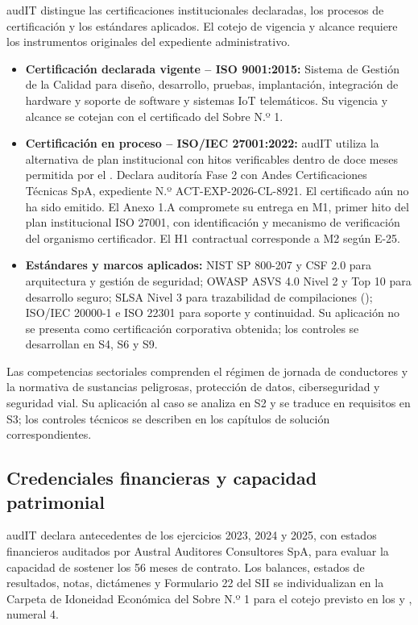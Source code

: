 audIT distingue las certificaciones institucionales declaradas, los procesos de certificación y los estándares aplicados. El cotejo de vigencia y alcance requiere los instrumentos originales del expediente administrativo.

\begin{itemize}
  \item \textbf{Certificación declarada vigente -- ISO 9001:2015:} Sistema de Gestión de la Calidad para diseño, desarrollo, pruebas, implantación, integración de hardware y soporte de software y sistemas IoT telemáticos. Su vigencia y alcance se cotejan con el certificado del Sobre N.º 1.
  \item \textbf{Certificación en proceso -- ISO/IEC 27001:2022:} audIT utiliza la alternativa de plan institucional con hitos verificables dentro de doce meses permitida por el . Declara auditoría Fase 2 con Andes Certificaciones Técnicas SpA, expediente N.º ACT-EXP-2026-CL-8921. El certificado aún no ha sido emitido. El Anexo 1.A compromete su entrega en M1, primer hito del plan institucional ISO 27001, con identificación y mecanismo de verificación del organismo certificador. El H1 contractual corresponde a M2 según E-25.
  \item \textbf{Estándares y marcos aplicados:} NIST SP 800-207 y CSF 2.0 para arquitectura y gestión de seguridad; OWASP ASVS 4.0 Nivel 2 y Top 10 para desarrollo seguro; SLSA Nivel 3 para trazabilidad de compilaciones (); ISO/IEC 20000-1 e ISO 22301 para soporte y continuidad. Su aplicación no se presenta como certificación corporativa obtenida; los controles se desarrollan en S4, S6 y S9.
\end{itemize}

Las competencias sectoriales comprenden el régimen de jornada de conductores y la normativa de sustancias peligrosas, protección de datos, ciberseguridad y seguridad vial. Su aplicación al caso se analiza en S2 y se traduce en requisitos en S3; los controles técnicos se describen en los capítulos de solución correspondientes.

\subsection{Credenciales financieras y capacidad patrimonial}\label{sec:1-financiero}

audIT declara antecedentes de los ejercicios 2023, 2024 y 2025, con estados financieros auditados por Austral Auditores Consultores SpA, para evaluar la capacidad de sostener los 56 meses de contrato. Los balances, estados de resultados, notas, dictámenes y Formulario 22 del SII se individualizan en la Carpeta de Idoneidad Económica del Sobre N.º 1 para el cotejo previsto en los  y , numeral 4.

